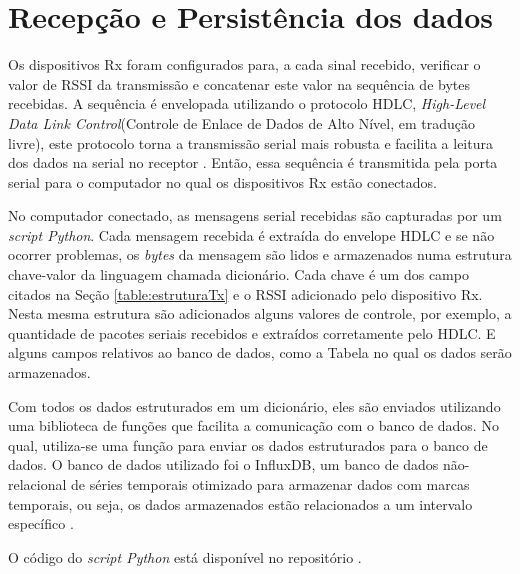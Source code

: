 \section{Recepção e Persistência dos dados}
Os dispositivos Rx foram configurados para, a cada sinal recebido, verificar o valor de RSSI da transmissão e concatenar este valor na sequência de bytes recebidas. A sequência é envelopada utilizando o protocolo HDLC, \emph{High-Level Data Link Control}(Controle de Enlace de Dados de Alto Nível, em tradução livre), este protocolo torna a transmissão serial mais robusta e facilita a leitura dos dados na serial no receptor \cite{tanembaum2011}. Então, essa sequência é transmitida pela porta serial para o computador no qual os dispositivos Rx estão conectados.

No computador conectado, as mensagens serial recebidas são capturadas por um \emph{script Python}. Cada mensagem recebida é extraída do envelope HDLC e se não ocorrer problemas, os \emph{bytes} da mensagem são lidos e armazenados numa estrutura chave-valor da linguagem chamada dicionário. Cada chave é um dos campo citados na Seção \ref{table:estruturaTx} e o RSSI adicionado pelo dispositivo Rx. Nesta mesma estrutura são adicionados alguns valores de controle, por exemplo, a quantidade de pacotes seriais recebidos e extraídos corretamente pelo HDLC. E alguns campos relativos ao banco de dados, como a Tabela no qual os dados serão armazenados.

Com todos os dados estruturados em um dicionário, eles são enviados utilizando uma biblioteca de funções que facilita a comunicação com o banco de dados. No qual, utiliza-se uma função para enviar os dados estruturados para o banco de dados. O banco de dados utilizado foi o InfluxDB, um banco de dados não-relacional de séries temporais otimizado para armazenar dados com marcas temporais, ou seja, os dados armazenados estão relacionados a um intervalo específico \cite{influxData}.

O código do \emph{script Python} está disponível no repositório \cite{openmoteb-serialReader}.


